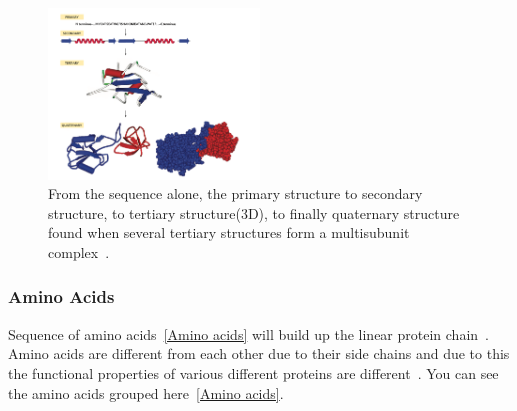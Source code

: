\documentclass[]{final_report}
\begin{document}
 
\begin{figure}[h]
    \centering
    \includegraphics[width=0.5\textwidth]{Protein Structure.png}
    \caption{\label{fig:levels of protein structure.}From the sequence alone, the primary structure to secondary structure, to tertiary structure(3D), to finally quaternary structure found when several tertiary structures form a multisubunit complex~\cite{zvelebil_understanding_2008}.}
\end{figure}
\clearpage

\subsubsection{Amino Acids}

Sequence of amino acids~\ref{Amino acids} will build up the linear protein chain~\cite{zvelebil_understanding_2008}. Amino acids are different from each other due to their side chains and due to this the functional properties of various different proteins are different~\cite{zvelebil_understanding_2008}. You can see the amino acids grouped here~\ref{Amino acids}.
\vspace{80px}
\end{document}
